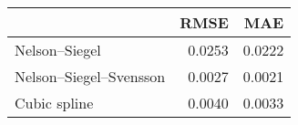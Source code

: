 \begin{tabular}{lrr}
\toprule
 & RMSE & MAE \\
\midrule
Nelson–Siegel & 0.0253 & 0.0222 \\
Nelson–Siegel–Svensson & 0.0027 & 0.0021 \\
Cubic spline & 0.0040 & 0.0033 \\
\bottomrule
\end{tabular}
